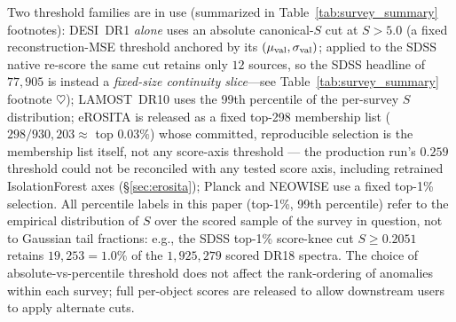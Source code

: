 \documentclass[aps,prd,twocolumn,superscriptaddress,showpacs,preprintnumbers,nofootinbib,longbibliography,floatfix]{revtex4-2}
\begin{document}
Two threshold families are in use (summarized in Table~\ref{tab:survey_summary} footnotes): DESI~DR1 \emph{alone} uses an absolute canonical-$S$ cut at $S > 5.0$ (a fixed reconstruction-MSE threshold anchored by its $(\mu_{\rm val}, \sigma_{\rm val})$; applied to the SDSS native re-score the same cut retains only $12$ sources, so the SDSS headline of $77{,}905$ is instead a \emph{fixed-size continuity slice}---see Table~\ref{tab:survey_summary} footnote $\heartsuit$); LAMOST~DR10 uses the 99th percentile of the per-survey $S$ distribution; eROSITA is released as a fixed top-298 membership list ($298/930{,}203 \approx$ top $0.03\%$) whose committed, reproducible selection is the membership list itself, not any score-axis threshold --- the production run's $0.259$ threshold could not be reconciled with any tested score axis, including retrained IsolationForest axes (\S\ref{sec:erosita}); Planck and NEOWISE use a fixed top-1\% selection. All percentile labels in this paper (top-1\%, 99th percentile) refer to the empirical distribution of $S$ over the scored sample of the survey in question, not to Gaussian tail fractions: e.g., the SDSS top-1\% score-knee cut $S \geq 0.2051$ retains $19{,}253 = 1.0\%$ of the $1{,}925{,}279$ scored DR18 spectra. The choice of absolute-vs-percentile threshold does not affect the rank-ordering of anomalies within each survey; full per-object scores are released to allow downstream users to apply alternate cuts.
\end{document}
